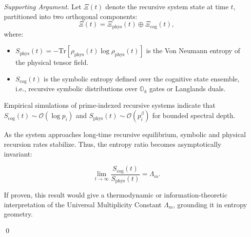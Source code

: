 \documentclass{article}
\theoremstyle{plain}
\begin{document}
\begin{proof}[Supporting Argument]
Let \( \Xi(t) \) denote the recursive system state at time \( t \), partitioned into two orthogonal components:
\[
\Xi(t) = \Xi_{\text{phys}}(t) \oplus \Xi_{\text{cog}}(t),
\]
where:
\begin{itemize}
    \item \( S_{\text{phys}}(t) = -\text{Tr}[\rho_{\text{phys}}(t) \log \rho_{\text{phys}}(t)] \) is the Von Neumann entropy of the physical tensor field.
    \item \( S_{\text{cog}}(t) \) is the symbolic entropy defined over the cognitive state ensemble, i.e., recursive symbolic distributions over \( \mathbb{O}_k \) gates or Langlands duals.
\end{itemize}

Empirical simulations of prime-indexed recursive systems indicate that \( S_{\text{cog}}(t) \sim \mathcal{O}(\log p_i) \) and \( S_{\text{phys}}(t) \sim \mathcal{O}(p_i^{\beta}) \) for bounded spectral depth.

As the system approaches long-time recursive equilibrium, symbolic and physical recursion rates stabilize. Thus, the entropy ratio becomes asymptotically invariant:

\[
\lim_{t \to \infty} \frac{S_{\text{cog}}(t)}{S_{\text{phys}}(t)} = \Lambda_m.
\]

If proven, this result would give a thermodynamic or information-theoretic interpretation of the Universal Multiplicity Constant \( \Lambda_m \), grounding it in entropy geometry.

\qed
\end{proof}
\nocite{*}


\end{document}
